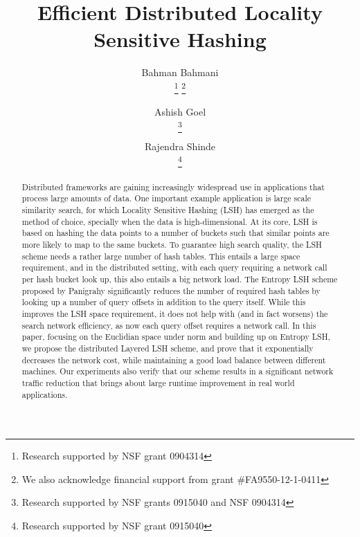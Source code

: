 \documentclass{acm_proc_article-sp}
\numberwithin{equation}{section}
\numberwithin{figure}{section}
\newcommand*\samethanks[1][\value{footnote}]{\footnotemark[#1]}
\begin{document}
\title{Efficient Distributed Locality Sensitive Hashing}
\author{
\alignauthor
Bahman Bahmani \\
\thanks{Research supported by NSF grant 0904314}
\thanks{We also acknowledge financial support from grant \#FA9550-12-1-0411}
\and
\alignauthor
Ashish Goel\\
\thanks{Research supported by NSF grants 0915040 and NSF 0904314}
\samethanks[2]
\and
\alignauthor
Rajendra Shinde\\
\thanks{Research supported by NSF grant 0915040}
\samethanks[2]
}
\maketitle
\begin{abstract}
Distributed frameworks are gaining increasingly widespread use in applications that process large amounts of data. One important example application is large scale similarity search, for which Locality Sensitive Hashing (LSH) has emerged as the method of choice, specially when the data is high-dimensional. At its core, LSH is based on hashing the data points to a number of buckets such that similar points are more likely to map to the same buckets. To guarantee high search quality, the LSH scheme needs a rather large number of hash tables. This entails a large space requirement, and in the distributed setting, with each query requiring a network call per hash bucket look up, this also entails a big network load. The Entropy LSH scheme proposed by Panigrahy significantly reduces the number of required hash tables by looking up a number of query offsets in addition to the query itself. While this improves the LSH space requirement, it does not help with (and in fact worsens) the search network efficiency, as now each query offset requires a network call. In this paper, focusing on the Euclidian space under  norm and building up on Entropy LSH, we propose the distributed Layered LSH scheme, and prove that it exponentially decreases the network cost, while maintaining a good load balance between different machines. Our experiments also verify that our scheme results in a significant network traffic reduction that brings about large runtime improvement in real world applications.
\end{abstract}
\end{document}

